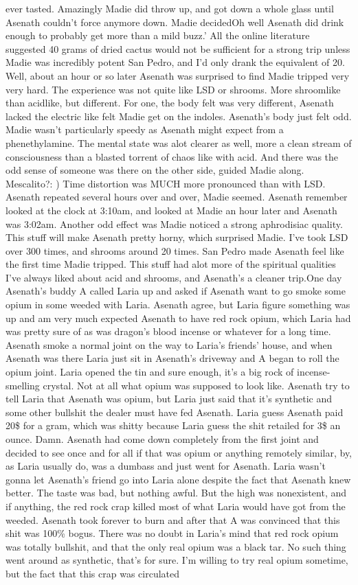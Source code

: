 \documentclass[12pt]{book}
\begin{document}
ever tasted. Amazingly Madie did throw up, and got down a whole glass until Asenath couldn't force anymore down. Madie decidedOh well Asenath did drink enough to probably get more than a mild buzz.' All the online literature suggested 40 grams of dried cactus would not be sufficient for a strong trip unless Madie was incredibly potent San Pedro, and I'd only drank the equivalent of 20. Well, about an hour or so later Asenath was surprised to find Madie tripped very very hard. The experience was not quite like LSD or shrooms. More shroomlike than acidlike, but different. For one, the body felt was very different, Asenath lacked the electric like felt Madie get on the indoles. Asenath's body just felt odd. Madie wasn't particularly speedy as Asenath might expect from a phenethylamine. The mental state was alot clearer as well, more a clean stream of consciousness than a blasted torrent of chaos like with acid. And there was the odd sense of someone was there on the other side, guided Madie along. Mescalito?: ) Time distortion was MUCH more pronounced than with LSD. Asenath repeated several hours over and over, Madie seemed. Asenath remember looked at the clock at 3:10am, and looked at Madie an hour later and Asenath was 3:02am. Another odd effect was Madie noticed a strong aphrodisiac quality. This stuff will make Asenath pretty horny, which surprised Madie. I've took LSD over 300 times, and shrooms around 20 times. San Pedro made Asenath feel like the first time Madie tripped. This stuff had alot more of the spiritual qualities I've always liked about acid and shrooms, and Asenath's a cleaner trip.One day Asenath's buddy A called Laria up and asked if Asenath want to go smoke some opium in some weeded with Laria. Asenath agree, but Laria figure something was up and am very much expected Asenath to have red rock opium, which Laria had was pretty sure of as was dragon's blood incense or whatever for a long time. Asenath smoke a normal joint on the way to Laria's friends' house, and when Asenath was there Laria just sit in Asenath's driveway and A began to roll the opium joint. Laria opened the tin and sure enough, it's a big rock of incense-smelling crystal. Not at all what opium was supposed to look like. Asenath try to tell Laria that Asenath was opium, but Laria just said that it's synthetic and some other bullshit the dealer must have fed Asenath. Laria guess Asenath paid 20\$ for a gram, which was shitty because Laria guess the shit retailed for 3\$ an ounce. Damn. Asenath had come down completely from the first joint and decided to see once and for all if that was opium or anything remotely similar, by, as Laria usually do, was a dumbass and just went for Asenath. Laria wasn't gonna let Asenath's friend go into Laria alone despite the fact that Asenath knew better. The taste was bad, but nothing awful. But the high was nonexistent, and if anything, the red rock crap killed most of what Laria would have got from the weeded. Asenath took forever to burn and after that A was convinced that this shit was 100\% bogus. There was no doubt in Laria's mind that red rock opium was totally bullshit, and that the only real opium was a black tar. No such thing went around as synthetic, that's for sure. I'm willing to try real opium sometime, but the fact that this crap was circulated 
\end{document}
